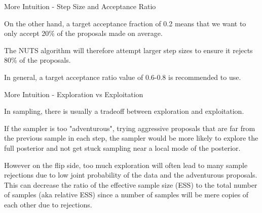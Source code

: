 \begin{frame}{More Intuition - Step Size and Acceptance Ratio}
	\begin{vfilleditems}
		\item On the other hand, a target acceptance fraction of 0.2 means that we want to only accept 20\% of the proposals made on average.
		\item The NUTS algorithm will therefore attempt larger step sizes to ensure it rejects 80\% of the proposals.
		\item In general, a target acceptance ratio value of 0.6-0.8 is recommended to use.
	\end{vfilleditems}
\end{frame}

\begin{frame}{More Intuition - Exploration vs Exploitation}
	\begin{vfilleditems}
		\item In sampling, there is usually a tradeoff between exploration and exploitation.
		\item If the sampler is too "adventurous", trying aggressive proposals that are far from the previous sample in each step, the sampler would be more likely to explore the full posterior and not get stuck sampling near a local mode of the posterior.
		\item However on the flip side, too much exploration will often lead to many sample rejections due to low joint probability of the data and the adventurous proposals. This can decrease the ratio of the effective sample size (ESS) to the total number of samples (aka relative ESS) since a number of samples will be mere copies of each other due to rejections.
	\end{vfilleditems}
\end{frame}

